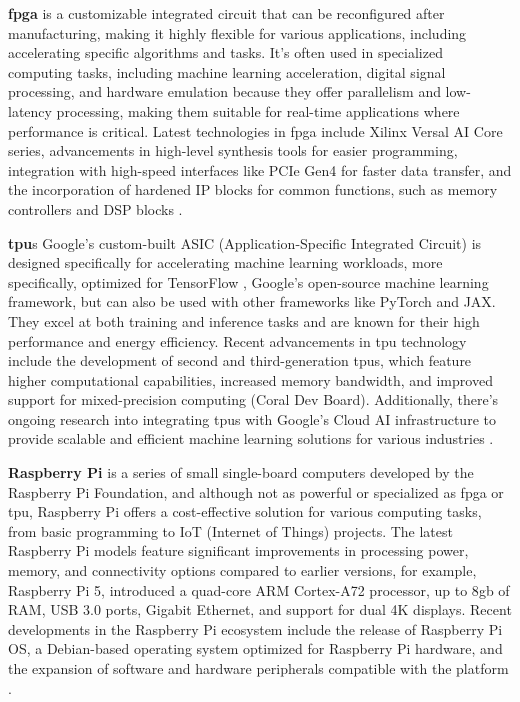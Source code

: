 \textbf{\gls{fpga}} is a customizable integrated circuit that can be reconfigured after manufacturing, making it highly flexible for various applications, including accelerating specific algorithms and tasks. It's often used in specialized computing tasks, including machine learning acceleration, digital signal processing, and hardware emulation because they offer parallelism and low-latency processing, making them suitable for real-time applications where performance is critical. Latest technologies in \gls{fpga} include Xilinx Versal AI Core series, advancements in high-level synthesis tools for easier programming, integration with high-speed interfaces like PCIe Gen4 for faster data transfer, and the incorporation of hardened IP blocks for common functions, such as memory controllers and DSP blocks \cite{IntelFPGA2024}.

\textbf{\gls{tpu}}s Google's custom-built ASIC (Application-Specific Integrated Circuit) is designed specifically for accelerating machine learning workloads, more specifically, optimized for TensorFlow \cite{TensorFl23}, Google's open-source machine learning framework, but can also be used with other frameworks like PyTorch and JAX. They excel at both training and inference tasks and are known for their high performance and energy efficiency. Recent advancements in \gls{tpu} technology include the development of second and third-generation \gls{tpu}s, which feature higher computational capabilities, increased memory bandwidth, and improved support for mixed-precision computing (Coral Dev Board). Additionally, there's ongoing research into integrating \gls{tpu}s with Google's Cloud AI infrastructure to provide scalable and efficient machine learning solutions for various industries \cite{GoogleTPU2024}.

\textbf{Raspberry Pi} is a series of small single-board computers developed by the Raspberry Pi Foundation, and although not as powerful or specialized as \gls{fpga} or \gls{tpu}, Raspberry Pi offers a cost-effective solution for various computing tasks, from basic programming to IoT (Internet of Things) projects. The latest Raspberry Pi models feature significant improvements in processing power, memory, and connectivity options compared to earlier versions, for example, Raspberry Pi 5, introduced a quad-core ARM Cortex-A72 processor, up to 8\gls{g}\gls{b} of RAM, USB 3.0 ports, Gigabit Ethernet, and support for dual 4K displays.
Recent developments in the Raspberry Pi ecosystem include the release of Raspberry Pi OS, a Debian-based operating system optimized for Raspberry Pi hardware, and the expansion of software and hardware peripherals compatible with the platform \cite{Raspberry2023}.


